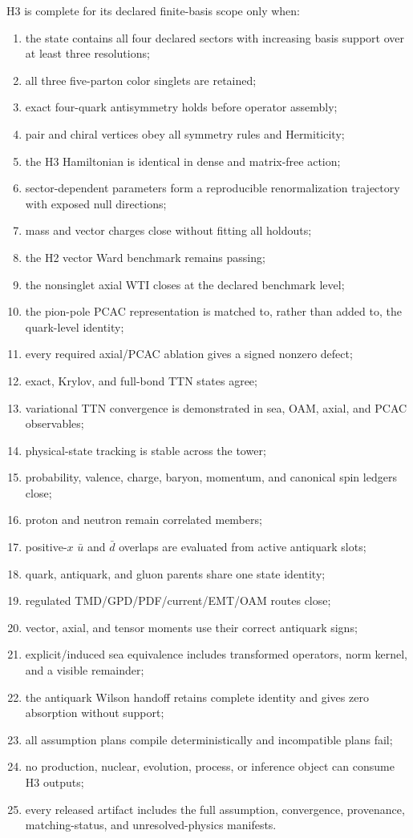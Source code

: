 \documentclass[11pt]{article}
\begin{document}
H3 is complete for its declared finite-basis scope only when:
\begin{enumerate}
 \item the state contains all four declared sectors with increasing basis
       support over at least three resolutions;
 \item all three five-parton color singlets are retained;
 \item exact four-quark antisymmetry holds before operator assembly;
 \item pair and chiral vertices obey all symmetry rules and Hermiticity;
 \item the H3 Hamiltonian is identical in dense and matrix-free action;
 \item sector-dependent parameters form a reproducible renormalization
       trajectory with exposed null directions;
 \item mass and vector charges close without fitting all holdouts;
 \item the H2 vector Ward benchmark remains passing;
 \item the nonsinglet axial WTI closes at the declared benchmark level;
 \item the pion-pole PCAC representation is matched to, rather than added to,
       the quark-level identity;
 \item every required axial/PCAC ablation gives a signed nonzero defect;
 \item exact, Krylov, and full-bond TTN states agree;
 \item variational TTN convergence is demonstrated in sea, OAM, axial, and
       PCAC observables;
 \item physical-state tracking is stable across the tower;
 \item probability, valence, charge, baryon, momentum, and canonical spin
       ledgers close;
 \item proton and neutron remain correlated members;
 \item positive-\(x\) \(\bar u\) and \(\bar d\) overlaps are evaluated from
       active antiquark slots;
 \item quark, antiquark, and gluon parents share one state identity;
 \item regulated TMD/GPD/PDF/current/EMT/OAM routes close;
 \item vector, axial, and tensor moments use their correct antiquark signs;
 \item explicit/induced sea equivalence includes transformed operators, norm
       kernel, and a visible remainder;
 \item the antiquark Wilson handoff retains complete identity and gives zero
       absorption without support;
 \item all assumption plans compile deterministically and incompatible plans
       fail;
 \item no production, nuclear, evolution, process, or inference object can
       consume H3 outputs;
 \item every released artifact includes the full assumption, convergence,
       provenance, matching-status, and unresolved-physics manifests.
\end{enumerate}
\end{document}
